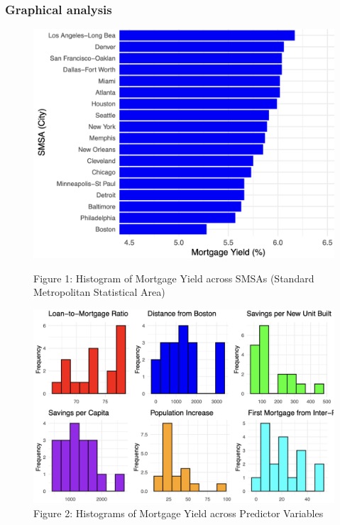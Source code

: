 \documentclass[
  12pt,
]{article}
\begin{document}
\subsubsection{Graphical analysis}\label{graphical-analysis}

\begin{figure}[H]
\centering

\begin{minipage}[t]{0.45\textwidth}
\centering
\includegraphics[width=1.1\linewidth]{figures/Figure 1.png}
\captionsetup{font=normalsize}
\caption*{Figure 1: Histogram of Mortgage Yield across SMSAs (Standard
Metropolitan Statistical Area)}
\end{minipage}
\hfill
\begin{minipage}[t]{0.5\textwidth}
\centering
\vspace{-6cm}
\includegraphics[width=1.1\linewidth]{figures/Figure 2.png}
\captionsetup{font=normalsize}
\caption*{Figure 2: Histograms of Mortgage Yield across Predictor Variables}
\end{minipage}

\end{figure}
\vspace{-0.5cm}
\end{document}
